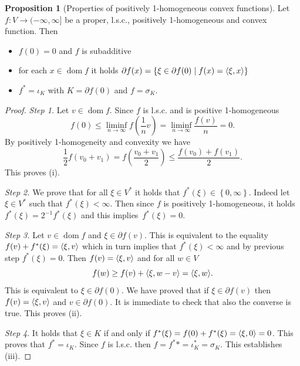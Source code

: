 \documentclass[a4paper,10pt,oneside]{amsbook}
\numberwithin{section}{chapter}
\numberwithin{equation}{chapter}
\theoremstyle{definition}
\newtheorem{prop}{Proposition}[chapter]
\DeclareMathOperator{\dom}{dom}
\DeclarePairedDelimiter{\dual}{\langle}{\rangle}
\begin{document}
\begin{prop}[Properties of positively 1-homogeneous convex functions]
\label{prop:prop-pos-1-hom-convx}
Let $f\colon V\to(-\infty,\infty]$ be a proper, l.s.c., positively 1-homogeneous and convex function. Then
\begin{itemize}
\item[(i)] $f(0)=0$ and $f$ is subadditive
\item[(ii)] for each $x\in\dom f$ it holds $\partial f(x)=\{\xi\in\partial f(0)\;|\;f(x)=\dual{\xi,x}\}$
\item[(iii)] $f^*=\iota_K$ with $K=\partial f(0)$ and $f=\sigma_K$.
\end{itemize}
\end{prop}
\begin{proof}
\emph{Step 1.} Let $v\in\dom f$. Since $f$ is l.s.c. and is positive 1-homogeneous
\begin{equation*}
f(0)\le\liminf_{n\to\infty}f\left(\frac{1}{n}v\right)=\liminf_{n\to\infty}\frac{f(v)}{n}=0.
\end{equation*}
By positively 1-homogeneity and convexity we have
\begin{equation*}
\frac{1}{2}f(v_0+v_1)=f\left(\frac{v_0+v_1}{2}\right)\le\frac{f(v_0)+f(v_1)}{2}.
\end{equation*}
This proves (i).

\emph{Step 2.} We prove that for all $\xi\in V^*$ it holds that $f^*(\xi)\in\left\{0,\infty\right\}$. Indeed let $\xi\in V^*$ such that $f^*(\xi)<\infty$. Then since $f$ is positively 1-homogeneous, it holds $f^*(\xi)=2^{-1}f^*(\xi)$ and this implies~$f^*(\xi)=0$.

\emph{Step 3.} Let $v\in\dom f$ and $\xi\in\partial f(v)$. This is equivalent to the equality $f(v)+f^*(\xi)=\dual{\xi,v}$ which in turn implies that $f^*(\xi)<\infty$ and by previous step $f^*(\xi)=0$. Then $f(v)=\dual{\xi,v}$ and for all $w\in V$
\begin{equation*}
f(w)\ge f(v)+\dual{\xi,w-v}=\dual{\xi,w}.
\end{equation*}
This is equivalent to $\xi\in\partial f(0)$. We have proved that if $\xi\in\partial f(v)$ then $f(v)=\dual{\xi,v}$ and $v\in\partial f(0)$. It is immediate to check that also the converse is true. This proves (ii).

\emph{Step 4}. It holds that $\xi\in K$ if and only if $f^*(\xi)=f(0)+f^*(\xi)=\dual{\xi,0}=0$. This proves that $f^*=\iota_K$. Since $f$ is l.s.c. then $f=f^**=\iota_K^*=\sigma_K$. This establishes (iii).
\end{proof}
\end{document}
